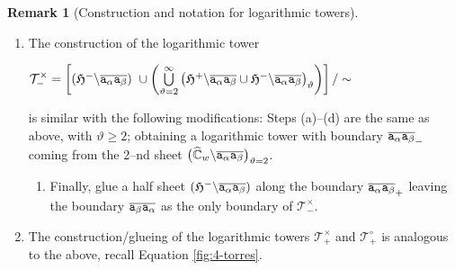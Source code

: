 \documentclass[final,3p,times]{elsarticle}
\newcommand{\CW}{\ensuremath{{\widehat{\mathbb C}}}}
\theoremstyle{definition}
\newtheorem{remark}[theorem]{Remark}
\begin{document}
\begin{remark}[Construction and notation for logarithmic towers]
\begin{enumerate}[label=\roman*),leftmargin=*]
\begin{enumerate}[label=\alph*),leftmargin=*]
\item
Next, 
for each $j\geq 1$,
glue one copy, say $\overline{{\tt a}_{\alpha} {\tt a}_{\beta}}_+$ from the $j$--th sheet
$\big( \CW_w \backslash  \overline{{\tt a}_{\alpha} 
{\tt a}_{\beta}
} \big)_{\vartheta=j}$, 
to a copy
$\overline{{\tt a}_{\alpha} {\tt a}_{\beta}}_-$ from the $(j+1)$--th sheet
$\big( \CW_w \backslash  \overline{{\tt a}_{\alpha} 
{\tt a}_{\beta}
} \big)_{\vartheta=j+1}$;
this leaves the geodesic segment 
$\overline{{\tt a}_{\alpha} {\tt a}_{\beta}}_-$ as the boundary of the sheet 
$\big( \CW_w \backslash  \overline{{\tt a}_{\alpha} 
{\tt a}_{\beta}
} \big)_{\vartheta=1}$; no other boundaries are left.


\item
Thus, the boundary of $\mathcal{T}^{\circ}_{-}$
is the open polygonal 
$\overline{{\tt a}_{\alpha} {\tt a}_{\beta}}_-$ 
coming from the 1--st sheet
$\big( \CW_w \backslash  \overline{{\tt a}_{\alpha} 
{\tt a}_{\beta}
} \big)_{\vartheta=1}$.
\end{enumerate}

\item
The construction of the logarithmic tower 

\centerline{
$\mathcal{T}^{\times}_{-} =
\left[ 
(\mathfrak{H}^- \backslash  \overline{{\tt a}_{\alpha} {\tt a}_{\beta}} )
\ \cup \left(
\bigcup\limits_{\vartheta=2}^{\infty} \big( 
\mathfrak{H}^+ \backslash  \overline{{\tt a}_{\alpha} {\tt a}_{\beta}} 
\cup
\mathfrak{H}^- \backslash  \overline{{\tt a}_{\alpha} {\tt a}_{\beta}} 
\big)_{\vartheta} 
\right)
\right] / \sim $}

\noindent
is similar with the following modifications:
Steps (a)--(d) are the same as above, with $\vartheta\geq 2$;
obtaining a logarithmic tower with boundary 
$\overline{{\tt a}_{\alpha} {\tt a}_{\beta}}_-$ 
coming from the 2--nd sheet
$\big( \CW_w \backslash  \overline{{\tt a}_{\alpha} 
{\tt a}_{\beta}
} \big)_{\vartheta=2}$.
\begin{enumerate}[label=\alph*),leftmargin=*]
\item[d)]
Finally, glue a half sheet 
$(\mathfrak{H}^- \backslash  \overline{{\tt a}_{\alpha} {\tt a}_{\beta}} )$ along the boundary
$\overline{{\tt a}_{\alpha} {\tt a}_{\beta}}_+$
leaving the boundary $\overline{{\tt a}_{\beta} {\tt a}_{\alpha}}$ as the only boundary of
$\mathcal{T}^\times_-$.

\end{enumerate}

\item The construction/glueing of the logarithmic towers $\mathcal{T}^\times_+$ and $\mathcal{T}^\circ_+$ is 
analogous to the above, recall Equation \eqref{fig:4-torres}.
\end{enumerate}


\end{remark}
\end{document}
